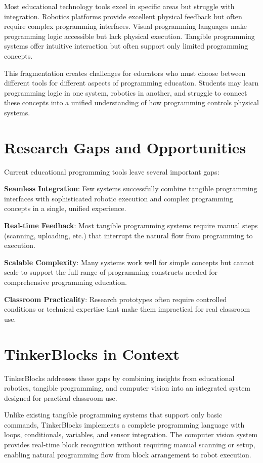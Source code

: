 Most educational technology tools excel in specific areas but struggle with integration. Robotics platforms provide excellent physical feedback but often require complex programming interfaces. Visual programming languages make programming logic accessible but lack physical execution. Tangible programming systems offer intuitive interaction but often support only limited programming concepts.

This fragmentation creates challenges for educators who must choose between different tools for different aspects of programming education. Students may learn programming logic in one system, robotics in another, and struggle to connect these concepts into a unified understanding of how programming controls physical systems.

\section{Research Gaps and Opportunities}

Current educational programming tools leave several important gaps:

\textbf{Seamless Integration}: Few systems successfully combine tangible programming interfaces with sophisticated robotic execution and complex programming concepts in a single, unified experience.

\textbf{Real-time Feedback}: Most tangible programming systems require manual steps (scanning, uploading, etc.) that interrupt the natural flow from programming to execution.

\textbf{Scalable Complexity}: Many systems work well for simple concepts but cannot scale to support the full range of programming constructs needed for comprehensive programming education.

\textbf{Classroom Practicality}: Research prototypes often require controlled conditions or technical expertise that make them impractical for real classroom use.

\section{TinkerBlocks in Context}

TinkerBlocks addresses these gaps by combining insights from educational robotics, tangible programming, and computer vision into an integrated system designed for practical classroom use.

Unlike existing tangible programming systems that support only basic commands, TinkerBlocks implements a complete programming language with loops, conditionals, variables, and sensor integration. The computer vision system provides real-time block recognition without requiring manual scanning or setup, enabling natural programming flow from block arrangement to robot execution.

